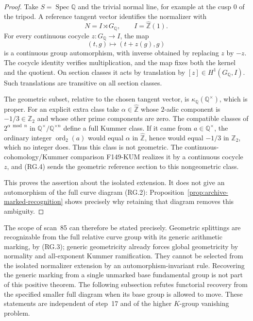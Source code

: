 \documentclass[11pt,a4paper]{article}
\theoremstyle{definition}
\begin{document}
\begin{proof}
Take $S=\operatorname{Spec}\mathbb Q$ and the trivial normal line,
for example at the cusp $0$ of the tripod. A reference tangent
vector identifies the normalizer with
\[
 N=I\rtimes G_{\mathbb Q},\qquad I=\widehat{\mathbb Z}(1).
\]
For every continuous cocycle $z:G_{\mathbb Q}\to I$, the map
\[
 (t,g)\longmapsto(t+z(g),g)                                 \tag{RG.4}
\]
is a continuous group automorphism, with inverse obtained by
replacing $z$ by $-z$. The cocycle identity verifies multiplication,
and the map fixes both the kernel and the quotient. On section
classes it acts by translation by $[z]\in H^1(G_{\mathbb Q},I)$.
Such translations are transitive on all section classes.

The geometric subset, relative to the chosen tangent vector, is
$\kappa_{\mathbb Q}(\mathbb Q^\times)$, which is proper.
For an explicit extra class take
$\alpha\in\widehat{\mathbb Z}$ whose $2$-adic component is
$-1/3\in\mathbb Z_2$ and whose other prime components are zero.
The compatible classes of $2^{\alpha\bmod n}$ in
$\mathbb Q^\times/\mathbb Q^{\times n}$ define a full Kummer class.
If it came from $a\in\mathbb Q^\times$, the ordinary integer
$\operatorname{ord}_2(a)$ would equal $\alpha$ in
$\widehat{\mathbb Z}$, hence would equal $-1/3$ in $\mathbb Z_2$,
which no integer does. Thus this class is not geometric.
The continuous-cohomology/Kummer comparison F149-KUM realizes it
by a continuous cocycle $z$, and (RG.4) sends the geometric
reference section to this nongeometric class.

This proves the assertion about the isolated extension. It does
not give an automorphism of the full curve diagram (RG.2):
Proposition~\ref{prop:archive-marked-recognition} shows precisely
why retaining that diagram removes this ambiguity.
\end{proof}

The scope of scan~85 can therefore be stated precisely. Geometric
splittings are recognizable from the full relative curve group
with its generic arithmetic marking, by (RG.3); generic geometricity
already forces global geometricity by normality and all-exponent
Kummer ramification. They cannot be selected from the isolated
normalizer extension by an automorphism-invariant rule. Recovering
the generic marking from a single unmarked base fundamental group
is not part of this positive theorem. The following subsection
refutes functorial recovery from the specified smaller full diagram
when its base group is allowed to move.
These statements are independent of step~17 and of the higher
$K$-group vanishing problem.
\end{document}
